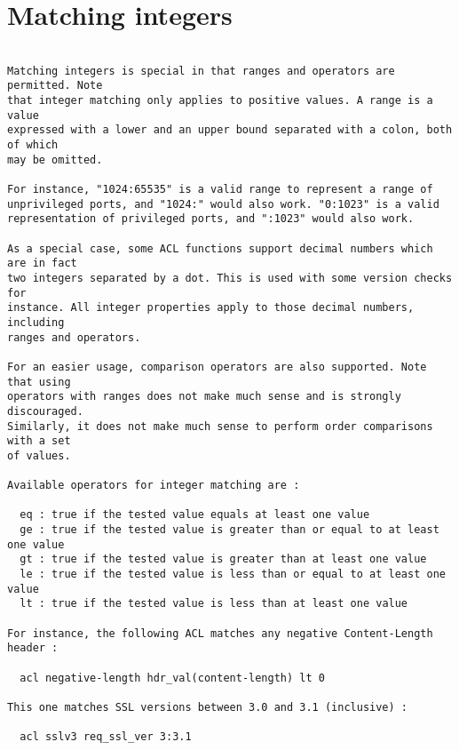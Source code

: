 
\section{Matching integers}

\begin{verbatim}

Matching integers is special in that ranges and operators are permitted. Note
that integer matching only applies to positive values. A range is a value
expressed with a lower and an upper bound separated with a colon, both of which
may be omitted.

For instance, "1024:65535" is a valid range to represent a range of
unprivileged ports, and "1024:" would also work. "0:1023" is a valid
representation of privileged ports, and ":1023" would also work.

As a special case, some ACL functions support decimal numbers which are in fact
two integers separated by a dot. This is used with some version checks for
instance. All integer properties apply to those decimal numbers, including
ranges and operators.

For an easier usage, comparison operators are also supported. Note that using
operators with ranges does not make much sense and is strongly discouraged.
Similarly, it does not make much sense to perform order comparisons with a set
of values.

Available operators for integer matching are :

  eq : true if the tested value equals at least one value
  ge : true if the tested value is greater than or equal to at least one value
  gt : true if the tested value is greater than at least one value
  le : true if the tested value is less than or equal to at least one value
  lt : true if the tested value is less than at least one value

For instance, the following ACL matches any negative Content-Length header :

  acl negative-length hdr_val(content-length) lt 0

This one matches SSL versions between 3.0 and 3.1 (inclusive) :

  acl sslv3 req_ssl_ver 3:3.1


\end{verbatim}
